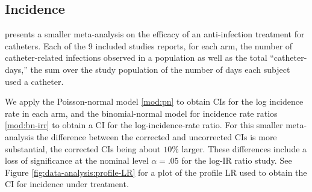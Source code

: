 \documentclass[12pt]{article}
\newcommand{\nGH}{n_{GH}}
\begin{document}

\subsection{Incidence}

\citet{niel:08} presents a smaller meta-analysis on the efficacy
of an anti-infection treatment for catheters. Each of the 9 included
studies reports, for each arm, the number of catheter-related
infections observed in a population as well as the total
``catheter-days,'' the sum over the study population of the number of days
each subject used a catheter.

We apply the Poisson-normal model \eqref{mod:pn} to obtain CIs for the
log incidence rate in each arm, and the binomial-normal model for
incidence rate ratios \eqref{mod:bn-irr} to obtain a CI for the
log-incidence-rate ratio. For this smaller meta-analysis the
difference between the corrected and uncorrected CIs is more
substantial, the corrected CIs being about $10\%$ larger. These
differences include a loss of significance at the nominal level
$\alpha=.05$ for the log-IR ratio study. See Figure
\ref{fig:data-analysis:profile-LR} for a plot of the profile LR used
to obtain the CI for incidence under treatment.
\end{document}
